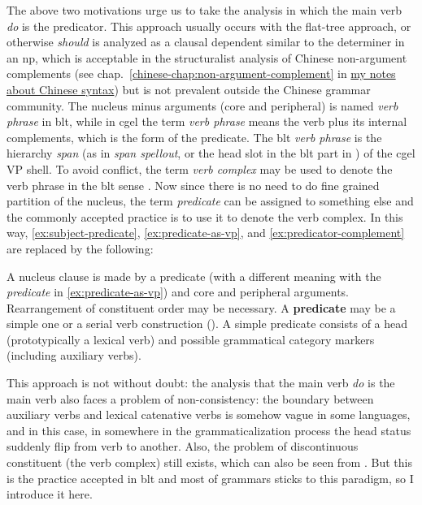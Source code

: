 \documentclass[UTF8, a4paper, oneside, scheme=plain]{ctexart}
\newcommand*{\citechap}[1]{chap.~{#1}}
\newcommand*{\concept}[1]{\textbf{#1}}
\newcommand*{\term}[1]{\emph{#1}}
\newcommand*{\corpus}[1]{\emph{#1}}
\newcommand{\chinesenote}{\href{../Chinese/main.pdf}{my notes about Chinese syntax}}
\begin{document}
The above two motivations urge us to take 
the analysis in which the main verb \corpus{do} is the predicator.
This approach usually occurs with the flat-tree approach,
or otherwise \corpus{should} is analyzed as a clausal dependent similar to the determiner in an \ac{np},
which is acceptable in the structuralist analysis of Chinese non-argument complements 
(see \citechap{\ref{chinese-chap:non-argument-complement}} in \chinesenote)
but is not prevalent outside the Chinese grammar community.
The nucleus minus arguments (core and peripheral) is named \term{verb phrase} in \ac{blt},
while in \ac{cgel} the term \term{verb phrase} means the verb plus its internal complements,
which is the form of the predicate.
The \ac{blt} \term{verb phrase} is the hierarchy \emph{span} 
(as in \term{span spellout}, or the head slot in the \ac{blt} part in ) 
of the \ac{cgel} VP shell.
To avoid conflict, 
the term \term{verb complex} may be used to denote the verb phrase in the \ac{blt} sense
\citep{hockett1948potawatomi,Friesen2017,Wilbur2014}.
Now since there is no need to do fine grained partition of the nucleus,
the term \term{predicate} can be assigned to something else 
and the commonly accepted practice is to use it to denote the verb complex.
In this way, \eqref{ex:subject-predicate}, \eqref{ex:predicate-as-vp}, and \eqref{ex:predicator-complement}
are replaced by the following:
\begin{exe}
    \ex A nucleus clause is made by a predicate
    (with a different meaning with the \term{predicate} in \eqref{ex:predicate-as-vp}) 
    and core and peripheral arguments.
    Rearrangement of constituent order may be necessary.
    \ex A \concept{predicate} may be a simple one or a serial verb construction 
    ().
    \ex A simple predicate consists of a head (prototypically a lexical verb) and  
    possible grammatical category markers (including auxiliary verbs). 
\end{exe}

This approach is not without doubt: the analysis that the main verb \corpus{do} is the main verb 
also faces a problem of non-consistency:
the boundary between auxiliary verbs and lexical catenative verbs %
is somehow vague in some languages, 
and in this case, in somewhere in the grammaticalization process the head status 
suddenly flip from verb to another.
Also, the problem of discontinuous constituent (the verb complex)
still exists, which can also be seen from .
But this is the practice accepted in \ac{blt} and most of grammars sticks to this paradigm,
so I introduce it here.
\end{document}
